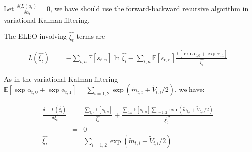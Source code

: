 \documentclass[11pt]{report}
\newcommand{\Ep}{\mathbb{E}}
\begin{document}
Let $\frac{\delta(L(\alpha_t)}{\delta \alpha_t}=0$, we have should use the forward-backward recursive algorithm in variational Kalman filtering. 

The ELBO involving $\hat{\xi_t}$ terms are 

\begin{eqnarray*}
L(\hat{\xi_t}) & = & - \sum_{t,n} \Ep[s_{t,n}] \ln \hat{\xi_t}  -  \sum_{t,n} \Ep[s_{t,n}] \frac{\Ep[\exp \alpha_{t,0} + \exp \alpha_{t,1} ]}{\hat{\xi_t}} 
\end{eqnarray*}

As in the variational Kalman filtering $\Ep[\exp \alpha_{t,0} + \exp \alpha_{t,1}]=\sum_{i=1,2} \exp (\tilde{m}_{t,i}+\tilde{V}_{t,i}/2)$, we have:

\begin{eqnarray}
\frac{\delta -L(\hat{\xi_t}) }{\delta \xi_t} & = & \frac{\sum_{t,n} \Ep[s_{t,n}] }{ \hat{\xi_t}  } + \frac{ \sum_{t,n} \Ep[s_{t,n}]  \sum_{i=1,2} \exp (\tilde{m}_{t,i}+\tilde{V}_{t,i}/2)}{\hat{\xi_t} ^2}\\\nonumber
& = & 0\\\nonumber
\hat{\xi_t} & = &  \sum_{i=1,2} \exp (\tilde{m}_{t,i}+\tilde{V}_{t,i}/2)
 \end{eqnarray}
\end{document}
